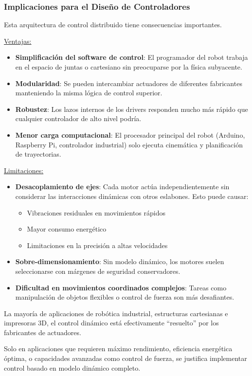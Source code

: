 \subsubsection{Implicaciones para el Diseño de Controladores}

Esta arquitectura de control distribuido tiene consecuencias importantes.

\underline{Ventajas:}

\begin{itemize}[label=$\bullet$]
    \item \textbf{Simplificación del software de control}: El programador del robot trabaja en el espacio de juntas o cartesiano sin preocuparse por la física subyacente.

    \item \textbf{Modularidad}: Se pueden intercambiar actuadores de diferentes fabricantes manteniendo la misma lógica de control superior.

    \item \textbf{Robustez}: Los lazos internos de los drivers responden mucho más rápido que cualquier controlador de alto nivel podría.

    \item \textbf{Menor carga computacional}: El procesador principal del robot (Arduino, Raspberry Pi, controlador industrial) solo ejecuta cinemática y planificación de trayectorias.
\end{itemize}

\underline{Limitaciones:}

\begin{itemize}[label=$\bullet$]
    \item \textbf{Desacoplamiento de ejes}: Cada motor actúa independientemente sin considerar las interacciones dinámicas con otros eslabones. Esto puede causar:
    \begin{itemize}[label=$\bullet$]
        \item Vibraciones residuales en movimientos rápidos
        \item Mayor consumo energético
        \item Limitaciones en la precisión a altas velocidades
    \end{itemize}

    \item \textbf{Sobre-dimensionamiento}: Sin modelo dinámico, los motores suelen seleccionarse con márgenes de seguridad conservadores.

    \item \textbf{Dificultad en movimientos coordinados complejos}: Tareas como manipulación de objetos flexibles o control de fuerza son más desafiantes.
\end{itemize}

La mayoría de aplicaciones de robótica industrial, estructuras cartesianas e impresoras 3D, el control dinámico está efectivamente ``resuelto'' por los fabricantes de actuadores. 

Solo en aplicaciones que requieren máximo rendimiento, eficiencia energética óptima, o capacidades avanzadas como control de fuerza, se justifica implementar control basado en modelo dinámico completo.
